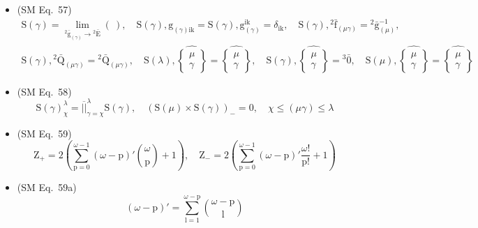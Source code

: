 \documentclass[
    12pt,              %
    a4paper,           %
    headings=normal,   %
    twoside=true,      %
    BCOR=8mm,          %
]{scrbook}
\begin{document}
\begin{itemize}[label={},leftmargin=0pt]
    \item (SM Eq.\ 57) 
    \[
    \begin{gathered}
    \mathrm{S}(\gamma) = \lim_{{}^2\bar{\mathrm{g}}_{(\gamma)} \to {}^2\bar{\mathrm{E}}} (\ ), \quad \mathrm{S}(\gamma), \mathrm{g}_{(\gamma)\mathrm{ik}} = \mathrm{S}(\gamma), \mathrm{g}_{(\gamma)}^{\mathrm{ik}} = \delta_{\mathrm{ik}}, \quad \mathrm{S}(\gamma), {}^2\bar{\mathrm{f}}_{(\mu\gamma)} = {}^2\bar{\mathrm{g}}_{(\mu)}^{-1}, \\
    \mathrm{S}(\gamma), {}^2\bar{\mathrm{Q}}_{(\mu\gamma)} = {}^2\bar{\mathrm{Q}}_{(\mu\gamma)}, \quad \mathrm{S}(\lambda), \widehat{\left\{ \begin{smallmatrix} \mu \\ \gamma \end{smallmatrix} \right\}} = \widehat{\left\{ \begin{smallmatrix} \mu \\ \gamma \end{smallmatrix} \right\}}, \quad \mathrm{S}(\gamma), \widehat{\left\{ \begin{smallmatrix} \mu \\ \gamma \end{smallmatrix} \right\}} = {}^3\bar{0}, \quad \mathrm{S}(\mu), \widehat{\left\{ \begin{smallmatrix} \mu \\ \gamma \end{smallmatrix} \right\}} = \widehat{\left\{ \begin{smallmatrix} \mu \\ \gamma \end{smallmatrix} \right\}}
    \end{gathered}
    \]

    \item (SM Eq.\ 58) 
    \[
    \mathrm{S}(\gamma)_\chi^\lambda = \overline{||}_{\gamma=\chi}^\lambda \mathrm{S}(\gamma), \quad \left( \mathrm{S}(\mu) \times \mathrm{S}(\gamma) \right)_- = 0, \quad \chi \le (\mu\gamma) \le \lambda
    \]

    \item (SM Eq.\ 59) 
    \[
    \mathrm{Z}_+ = 2\left( \sum_{\mathrm{p}=0}^{\omega-1} (\omega-\mathrm{p})' \binom{\omega}{\mathrm{p}} + 1 \right), \quad \mathrm{Z}_- = 2\left( \sum_{\mathrm{p}=0}^{\omega-1} (\omega-\mathrm{p})' \frac{\omega!}{\mathrm{p}!} + 1 \right)
    \]

    \item (SM Eq.\ 59a) 
    \[
    (\omega-\mathrm{p})' = \sum_{\mathrm{l}=1}^{\omega-\mathrm{p}} \binom{\omega-\mathrm{p}}{\mathrm{l}}
    \]


\end{itemize}
\end{document}
